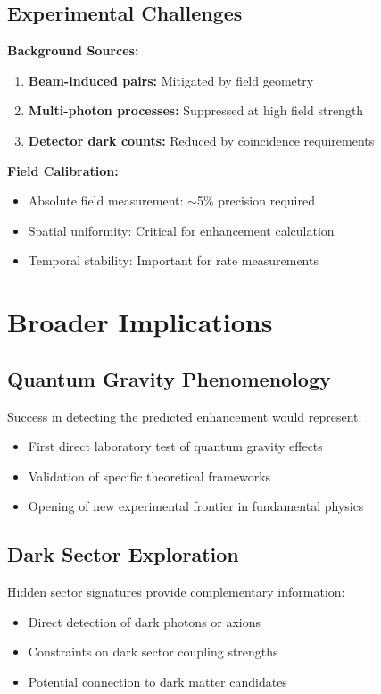 \documentclass[12pt]{article}
\begin{document}
\subsection{Experimental Challenges}

\textbf{Background Sources:}
\begin{enumerate}
\item \textbf{Beam-induced pairs:} Mitigated by field geometry
\item \textbf{Multi-photon processes:} Suppressed at high field strength
\item \textbf{Detector dark counts:} Reduced by coincidence requirements
\end{enumerate}

\textbf{Field Calibration:}
\begin{itemize}
\item Absolute field measurement: $\sim$5\% precision required
\item Spatial uniformity: Critical for enhancement calculation
\item Temporal stability: Important for rate measurements
\end{itemize}

\section{Broader Implications}

\subsection{Quantum Gravity Phenomenology}

Success in detecting the predicted enhancement would represent:
\begin{itemize}
\item First direct laboratory test of quantum gravity effects
\item Validation of specific theoretical frameworks
\item Opening of new experimental frontier in fundamental physics
\end{itemize}

\subsection{Dark Sector Exploration}

Hidden sector signatures provide complementary information:
\begin{itemize}
\item Direct detection of dark photons or axions
\item Constraints on dark sector coupling strengths
\item Potential connection to dark matter candidates
\end{itemize}
\end{document}
